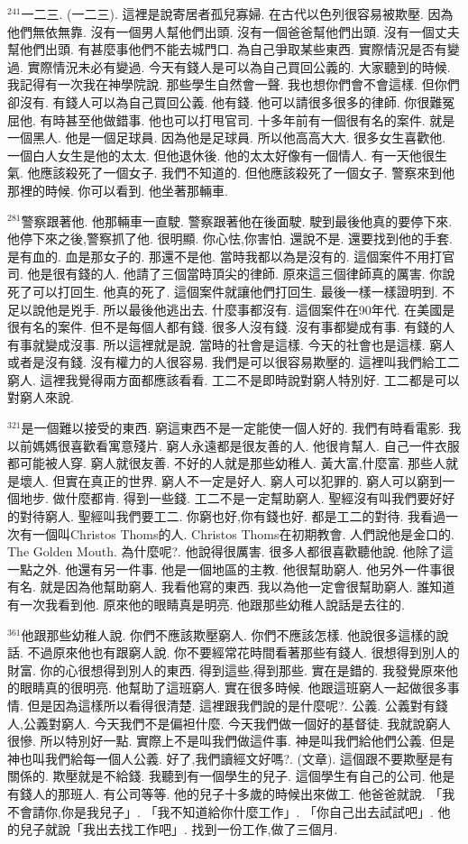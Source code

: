 \documentclass{book}
\begin{document}
$^{241}$一二三.
(一二三).
這裡是說寄居者孤兒寡婦.
在古代以色列很容易被欺壓.
因為他們無依無靠.
沒有一個男人幫他們出頭.
沒有一個爸爸幫他們出頭.
沒有一個丈夫幫他們出頭.
有甚麼事他們不能去城門口.
為自己爭取某些東西.
實際情況是否有變過.
實際情況未必有變過.
今天有錢人是可以為自己買回公義的.
大家聽到的時候.
我記得有一次我在神學院說.
那些學生自然會一聲.
我也想你們會不會這樣.
但你們卻沒有.
有錢人可以為自己買回公義.
他有錢.
他可以請很多很多的律師.
你很難冤屈他.
有時甚至他做錯事.
他也可以打甩官司.
十多年前有一個很有名的案件.
就是一個黑人.
他是一個足球員.
因為他是足球員.
所以他高高大大.
很多女生喜歡他.
一個白人女生是他的太太.
但他退休後.
他的太太好像有一個情人.
有一天他很生氣.
他應該殺死了一個女子.
我們不知道的.
但他應該殺死了一個女子.
警察來到他那裡的時候.
你可以看到.
他坐著那輛車.

$^{281}$警察跟著他.
他那輛車一直駛.
警察跟著他在後面駛.
駛到最後他真的要停下來.
他停下來之後,警察抓了他.
很明顯.
你心怯,你害怕.
還說不是.
還要找到他的手套.
是有血的.
血是那女子的.
那還不是他.
當時我都以為是沒有的.
這個案件不用打官司.
他是很有錢的人.
他請了三個當時頂尖的律師.
原來這三個律師真的厲害.
你說死了可以打回生.
他真的死了.
這個案件就讓他們打回生.
最後一樣一樣證明到.
不足以說他是兇手.
所以最後他逃出去.
什麼事都沒有.
這個案件在90年代.
在美國是很有名的案件.
但不是每個人都有錢.
很多人沒有錢.
沒有事都變成有事.
有錢的人有事就變成沒事.
所以這裡就是說.
當時的社會是這樣.
今天的社會也是這樣.
窮人或者是沒有錢.
沒有權力的人很容易.
我們是可以很容易欺壓的.
這裡叫我們給工二窮人.
這裡我覺得兩方面都應該看看.
工二不是即時說對窮人特別好.
工二都是可以對窮人來說.

$^{321}$是一個難以接受的東西.
窮這東西不是一定能使一個人好的.
我們有時看電影.
我以前媽媽很喜歡看寓意殘片.
窮人永遠都是很友善的人.
他很肯幫人.
自己一件衣服都可能被人穿.
窮人就很友善.
不好的人就是那些幼稚人.
黃大富,什麼富.
那些人就是壞人.
但實在真正的世界.
窮人不一定是好人.
窮人可以犯罪的.
窮人可以窮到一個地步.
做什麼都肯.
得到一些錢.
工二不是一定幫助窮人.
聖經沒有叫我們要好好的對待窮人.
聖經叫我們要工二.
你窮也好,你有錢也好.
都是工二的對待.
我看過一次有一個叫Christos Thoms的人.
Christos Thoms在初期教會.
人們說他是金口的.
The Golden Mouth.
為什麼呢?.
他說得很厲害.
很多人都很喜歡聽他說.
他除了這一點之外.
他還有另一件事.
他是一個地區的主教.
他很幫助窮人.
他另外一件事很有名.
就是因為他幫助窮人.
我看他寫的東西.
我以為他一定會很幫助窮人.
誰知道有一次我看到他.
原來他的眼睛真是明亮.
他跟那些幼稚人說話是去往的.

$^{361}$他跟那些幼稚人說.
你們不應該欺壓窮人.
你們不應該怎樣.
他說很多這樣的說話.
不過原來他也有跟窮人說.
你不要經常花時間看著那些有錢人.
很想得到別人的財富.
你的心很想得到別人的東西.
得到這些,得到那些.
實在是錯的.
我發覺原來他的眼睛真的很明亮.
他幫助了這班窮人.
實在很多時候.
他跟這班窮人一起做很多事情.
但是因為這樣所以看得很清楚.
這裡跟我們說的是什麼呢?.
公義.
公義對有錢人,公義對窮人.
今天我們不是偏袒什麼.
今天我們做一個好的基督徒.
我就說窮人很慘.
所以特別好一點.
實際上不是叫我們做這件事.
神是叫我們給他們公義.
但是神也叫我們給每一個人公義.
好了,我們讀經文好嗎?.
(文章).
這個跟不要欺壓是有關係的.
欺壓就是不給錢.
我聽到有一個學生的兒子.
這個學生有自己的公司.
他是有錢人的那班人.
有公司等等.
他的兒子十多歲的時候出來做工.
他爸爸就說.
「我不會請你,你是我兒子」.
「我不知道給你什麼工作」.
「你自己出去試試吧」.
他的兒子就說「我出去找工作吧」.
找到一份工作,做了三個月.
\end{document}

